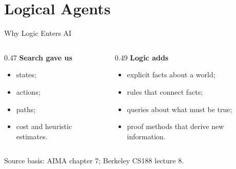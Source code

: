\documentclass[aspectratio=169,11pt]{beamer}
\newcommand{\minihead}[1]{\textbf{\color{unswblue}#1}}
\newcommand{\source}[1]{\vfill{\scriptsize\color{darkgrey}Source basis: #1}}
\begin{document}
\section{Logical Agents}

\begin{frame}{Why Logic Enters AI}
  \begin{columns}[T,onlytextwidth]
    \begin{column}{0.47\textwidth}
      \minihead{Search gave us}
      \begin{itemize}
        \item states;
        \item actions;
        \item paths;
        \item cost and heuristic estimates.
      \end{itemize}
    \end{column}
    \begin{column}{0.49\textwidth}
      \minihead{Logic adds}
      \begin{itemize}
        \item explicit facts about a world;
        \item rules that connect facts;
        \item queries about what must be true;
        \item proof methods that derive new information.
      \end{itemize}
    \end{column}
  \end{columns}

  \source{AIMA chapter 7; Berkeley CS188 lecture 8.}
\end{frame}
\end{document}
